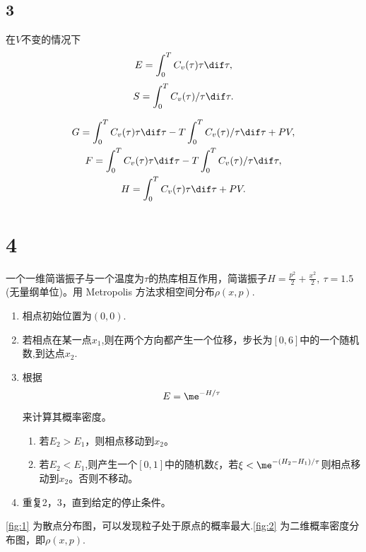 \documentclass[12pt]{article}
\begin{document}
\subsection{3}

在$V$不变的情况下
\begin{equation}
	E = \int_0^T C_v(\tau)\tau \dif \tau,
\end{equation}
\begin{equation}
	S = \int_0^T C_v(\tau)/\tau \dif \tau.
\end{equation}

\begin{gather}
	G = \int_0^T C_v(\tau)\tau \dif \tau-T\int_0^T C_v(\tau)/\tau \dif \tau+PV,\\
	F=\int_0^T C_v(\tau)\tau \dif \tau-T\int_0^T C_v(\tau)/\tau \dif \tau,\\
	H=\int_0^T C_v(\tau)\tau \dif \tau+PV.
\end{gather}


\section{4}

一个一维简谐振子与一个温度为$\tau$的热库相互作用，简谐振子$H=\frac{p^2}{2}+\frac{x^2}{2},\ \tau = 1.5$(无量纲单位)。用 Metropolis 方法求相空间分布$\rho(x,p)$.

\begin{enumerate}
	\item 相点初始位置为$(0,0)$.
	\item 若相点在某一点$x_1$,则在两个方向都产生一个位移，步长为$[0,6]$中的一个随机数,到达点$x_2$.
	\item 根据
	      \begin{equation}
		      E = \me^{-H/\tau}
	      \end{equation}
	      来计算其概率密度。
	      \begin{enumerate}
		      \item 若$E_2>E_1$，则相点移动到$x_2$。
		      \item 若$E_2<E_1$,则产生一个$[0,1]$中的随机数$\xi$，若$\xi<\me^{-(H_2-H_1)/\tau}$则相点移动到$x_2$。否则不移动。
	      \end{enumerate}
	\item 重复2，3，直到给定的停止条件。
\end{enumerate}

\cref{fig:1} 为散点分布图，可以发现粒子处于原点的概率最大.\cref{fig:2} 为二维概率密度分布图，即$\rho(x,p)$.
\end{document}
